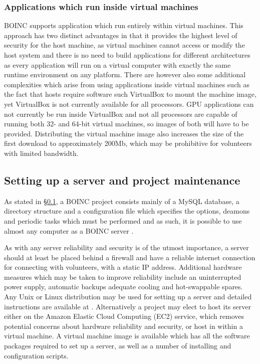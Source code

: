 \subsubsection{Applications which run inside virtual machines}
BOINC supports application which run entirely within virtual machines. This approach has two distinct advantages in that it provides the highest level of security for the host machine, as virtual machines cannot access or modify the host system and there is no need to build applications for different architectures as every application will run on a virtual computer with exactly the same runtime environment on any platform.  
There are however also some additional complexities which arise from using applications inside virtual machines such as the fact  that hosts require software such VirtualBox to mount the machine image, yet VirtualBox  is not currently available for all processors. GPU applications can not currently be run inside VirtualBox and not all processors are capable of running both 32- and 64-bit virtual machines, so images of both will have to be provided. Distributing the virtual machine image also increases the size of the first download to approximately 200Mb, which may be prohibitive for volunteers with limited bandwidth.

\subsection{Setting up a server and project maintenance}
As stated in \S \ref{}, a BOINC project consists mainly of a MySQL database, a directory structure and a configuration file which specifies the options, deamons and periodic tasks which must be performed and as such, it is possible to use almost any computer as a  BOINC server \cite{boincwiki}.

As with any server reliability and security is of the utmost importance, a server should at least be placed behind a firewall and have a reliable internet connection for connecting with volunteers, with a static IP address. Additional hardware measures which may  be taken to improve reliability  include an uninterrupted power supply, automatic backups adequate cooling and hot-swappable spares. Any Unix or Linux distribution may be used for setting up a server and  detailed instructions are available at \cite{boincwiki}. 
Alternatively a project may elect to host its server either on the Amazon Elastic Cloud Computing (EC2) service, which removes   potential concerns about hardware reliability and security, or host in within a virtual machine. A virtual machine image is available which has all the software packages required to set up a server, as well  as a number of installing and configuration scripts.  

